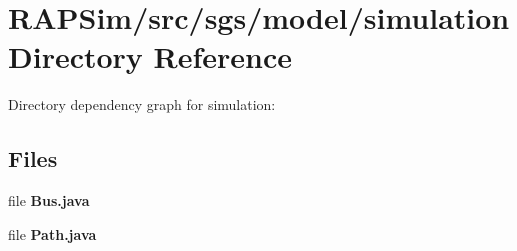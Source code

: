 \section{R\-A\-P\-Sim/src/sgs/model/simulation Directory Reference}
\label{dir_bc5b6325453d08877d1e7d95e57c83b9}
Directory dependency graph for simulation\-:
\subsection*{Files}
\begin{DoxyCompactItemize}
\item 
file {\bf Bus.\-java}
\item 
file {\bf Path.\-java}
\end{DoxyCompactItemize}
